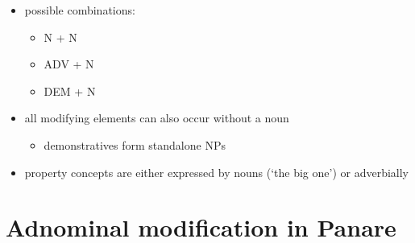\documentclass[10pt]{article}
\begin{document}
\begin{itemize}
\tightlist
\item
  possible combinations:

  \begin{itemize}
  \tightlist
  \item
    N\textsubscript{} + N
  \item
    ADV + N
  \item
    DEM + N
  \end{itemize}
\item
  all modifying elements can also occur without a noun

  \begin{itemize}
  \tightlist
  \item
    demonstratives form standalone NPs
  \end{itemize}
\item
  property concepts are either expressed by nouns (`the big one') or
  adverbially \parencites{meira2009property}
\end{itemize}


\section{Adnominal modification in Panare}
\end{document}
